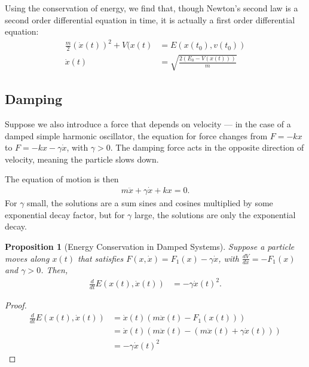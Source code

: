 \documentclass[12pt]{extarticle}
\theoremstyle{plain}
\newtheorem*{proposition}{Proposition}%
\theoremstyle{definition}
\theoremstyle{remark}
\renewcommand{\newline}{\hfill\break}
\begin{document}
  Using the conservation of energy, we find that, though Newton's second law is a second order differential equation in time, it is actually a first order differential equation:
  \begin{align*}
    \frac{m}{2}\left(\dot{x}(t)\right)^2 + V(x(t) &= E(x(t_0),v(t_0))\\
    \dot{x}(t) &= \sqrt{\frac{2(E_0 - V(x(t)))}{m}}
  \end{align*}
  \subsection{Damping}%
  Suppose we also introduce a force that depends on velocity --- in the case of a damped simple harmonic oscillator, the equation for force changes from $F = -kx$ to $F = -kx - \gamma\dot{x}$, with $\gamma > 0$. The damping force acts in the opposite direction of velocity, meaning the particle slows down.\newline

  The equation of motion is then
  \begin{align*}
    m\ddot{x} + \gamma\dot{x} + kx = 0.
  \end{align*}
  For $\gamma$ small, the solutions are a sum sines and cosines multiplied by some exponential decay factor, but for $\gamma$ large, the solutions are only the exponential decay.\newline
  \begin{proposition}[Energy Conservation in Damped Systems]
    Suppose a particle moves along $x(t)$ that satisfies $F(x,\dot{x}) = F_1(x) - \gamma\dot{x}$, with $\frac{dV}{dx} = -F_1(x)$ and $\gamma > 0$. Then,
    \begin{align*}
      \frac{d}{dt}E(x(t),\dot{x}(t)) &= -\gamma\dot{x}(t)^2.
    \end{align*}
  \end{proposition}
  \begin{proof}
      \begin{align*}
        \frac{d}{dt}E(x(t),\dot{x}(t)) &= \dot{x}(t)\left(m\ddot{x}(t) - F_1(x(t))\right)\\
                                       &= \dot{x}(t)\left(m\ddot{x}(t) - (m\ddot{x}(t) + \gamma\dot{x}(t))\right)\\
                                       &= -\gamma\dot{x}(t)^2
      \end{align*}
  \end{proof}
\end{document}
